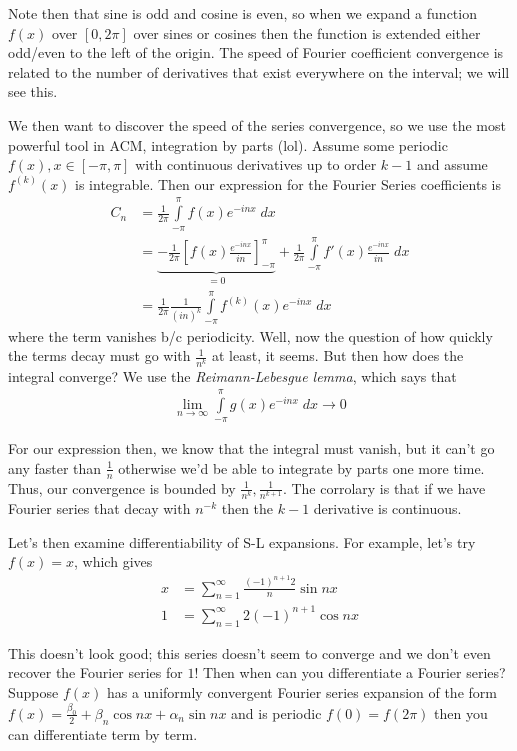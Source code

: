 \documentclass[10pt]{report}
\begin{document}
Note then that sine is odd and cosine is even, so when we expand a function $f(x)$ over $[0,2\pi]$ over sines or cosines then the function is extended either odd/even to the left of the origin. The speed of Fourier coefficient convergence is related to the number of derivatives that exist everywhere on the interval; we will see this.

We then want to discover the speed of the series convergence, so we use the most powerful tool in ACM, integration by parts (lol). Assume some periodic $f(x), x \in [-\pi, \pi]$ with continuous derivatives up to order $k-1$ and assume $f^{(k)}(x)$ is integrable. Then our expression for the Fourier Series coefficients is
\begin{align}
    C_n &= \frac{1}{2\pi}\displaystyle\int\limits_{-\pi}^{\pi}f(x)e^{-inx}\;dx\\
    &= \underbrace{-\frac{1}{2\pi}\left[ f(x)\frac{e^{-inx}}{in} \right]_{-\pi}^\pi}_{=0} + \frac{1}{2\pi}\displaystyle\int\limits_{-\pi}^{\pi}f'(x)\frac{e^{-inx}}{in}\;dx\\
    &= \frac{1}{2\pi}\frac{1}{(in)^k}\displaystyle\int\limits_{-\pi}^{\pi}f^{(k)}(x)e^{-inx}\;dx
\end{align}
where the term vanishes b/c periodicity. Well, now the question of how quickly the terms decay must go with $\frac{1}{n^k}$ at least, it seems. But then how does the integral converge? We use the \emph{Reimann-Lebesgue lemma}, which says that
\begin{align}
    \lim_{n \to \infty}\displaystyle\int\limits_{-\pi}^{\pi}g(x)e^{-inx}\;dx \to 0\label{2.28.RLL}
\end{align}

For our expression then, we know that the integral must vanish, but it can't go any faster than $\frac{1}{n}$ otherwise we'd be able to integrate by parts one more time. Thus, our convergence is bounded by $\frac{1}{n^k}, \frac{1}{n^{k+1}}$. The corrolary is that if we have Fourier series that decay with $n^{-k}$ then the $k-1$ derivative is continuous. 

Let's then examine differentiability of S-L expansions. For example, let's try $f(x) = x$, which gives
\begin{align}
    x &= \sum_{n=1}^{\infty}\frac{(-1)^{n+1}2}{n}\sin nx\\
    1 &= \sum_{n=1}^{\infty}2\left( -1 \right)^{n+1}\cos nx
\end{align}

This doesn't look good; this series doesn't seem to converge and we don't even recover the Fourier series for $1$! Then when can you differentiate a Fourier series? Suppose $f(x)$ has a uniformly convergent Fourier series expansion of the form $f(x) = \frac{\beta_0}{2} + \beta_n\cos nx + \alpha_n \sin nx$ and is periodic $f(0) = f(2\pi)$ then you can differentiate term by term. 
\end{document}
